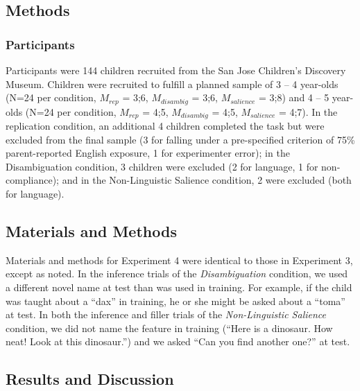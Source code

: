 \documentclass[review]{elsarticle}
\begin{document}
\subsection{Methods}

\subsubsection{Participants}

Participants were 144 children recruited from the San Jose Children's Discovery Museum. Children were recruited to fulfill a planned sample of 3 -- 4 year-olds (N=24 per condition, $M_{rep}$ = 3;6, $M_{disambig}$ = 3;6, $M_{salience}$ = 3;8) and 4 -- 5 year-olds (N=24 per condition, $M_{rep}$ = 4;5, $M_{disambig}$ = 4;5, $M_{salience}$ = 4;7). In the replication condition, an additional 4 children completed the task but were excluded from the final sample (3 for falling under a pre-specified criterion of 75\% parent-reported English  exposure, 1 for experimenter error); in the Disambiguation condition, 3 children were excluded (2 for language, 1 for non-compliance); and in the Non-Linguistic Salience condition, 2 were excluded (both for language).

\subsection{Materials and Methods}

Materials and methods for Experiment 4 were identical to those in Experiment 3, except as noted. In the inference trials of the {\em Disambiguation} condition, we used a different novel name at test than was used in training. For example, if the child was taught about a ``dax'' in training, he or she might be asked about a ``toma'' at test. In both the inference and filler trials of the {\em Non-Linguistic Salience} condition, we did not name the feature in training (``Here is a dinosaur. How neat! Look at this dinosaur.'') and we asked ``Can you find another one?'' at test.

\subsection{Results and Discussion}
\end{document}
